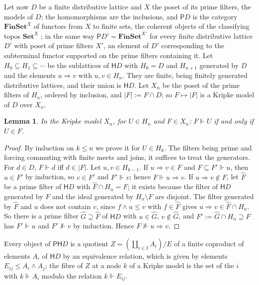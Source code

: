 \documentclass[11pt]{amsart}
\newtheorem{lem}[thm]{Lemma}
\theoremstyle{definition}
\newcommand{\Set}{\mathbf{Set}}
\newcommand{\PP}{\mathsf P}
\newcommand{\HH}{\mathsf H}
\begin{document}
Let now $D$ be a finite distributive lattice and $X$ the poset of its
prime filters, the models of $D$; the homomorphisms are the
inclusions, and $\PP D$ is the category $\mathbf{FinSet}^X$ of functors
from $X$ to finite sets, the coherent objects of the classifying topos
$\Set^X$ \cite[D3.3]{Elephant}; in the same way $\PP D'=
\mathbf{FinSet}^{X'}$ for every finite distributive lattice $D'$ with
poset of prime filters $X'$, an element of $D'$ corresponding to the
subterminal functor supported on the prime filters containing it. Let
$H_0\subseteq H_1\subseteq\cdots$ be the sublattices of $\HH D$ with
$H_0=D$ and $H_{n+1}$ generated by $D$ and the elements $u\Rightarrow
v$ with $u,v\in H_n$. They are finite, being finitely generated
distributive lattices, and their union is $\HH D$. Let $X_n$ be the
poset of the prime filters of $H_n$, ordered by inclusion, and
$|F|:=F\cap D$; so $F\mapsto|F|$ is a Kripke model of $D$ over $X_n$.

\begin{lem}\label{lem:truth}
In the Kripke model $X_n$, for $U\in H_n$ and $F\in X_n$: $F\Vdash U$
if and only if $U\in F$.
\end{lem}
\begin{proof}
By induction on $k\le n$ we prove it for $U\in H_k$. The filters being
prime and forcing commuting with finite meets and joins, it suffices to
treat the generators. For $d\in D$, $F\Vdash d$ iff $d\in|F|$. Let
$u,v\in H_{k-1}$. If $u\Rightarrow v\in F$ and $F\subseteq F'\Vdash u$,
then $u\in F'$ by induction, so $v\in F'$ and $F'\Vdash v$; hence
$F\Vdash u\Rightarrow v$. If $u\Rightarrow v\notin F$, let $\hat F$ be a
prime filter of $\HH D$ with $\hat F\cap H_n=F$; it exists because the
filter of $\HH D$ generated by $F$ and the ideal generated by
$H_n\setminus F$ are disjoint. The filter generated by $\hat F$ and $u$
does not contain $v$, since $f\wedge u\le v$ with $f\in\hat F$ gives
$u\Rightarrow v\in\hat F\cap H_n$. So there is a prime filter $\hat G
\supseteq\hat F$ of $\HH D$ with $u\in\hat G$, $v\notin\hat G$, and
$F':=\hat G\cap H_n\supseteq F$ has $F'\Vdash u$ and $F'\nVdash v$ by
induction. Hence $F\nVdash u\Rightarrow v$.
\end{proof}

Every object of $\PP\HH D$ is a quotient $Z=(\coprod_{i\in I}A_i)/E$ of
a finite coproduct of elements $A_i$ of $\HH D$ by an equivalence
relation, which is given by elements $E_{ij}\le A_i\wedge A_j$; the
fibre of $Z$ at a node $k$ of a Kripke model is the set of the $i$ with
$k\Vdash A_i$ modulo the relation $k\Vdash E_{ij}$.
\end{document}
